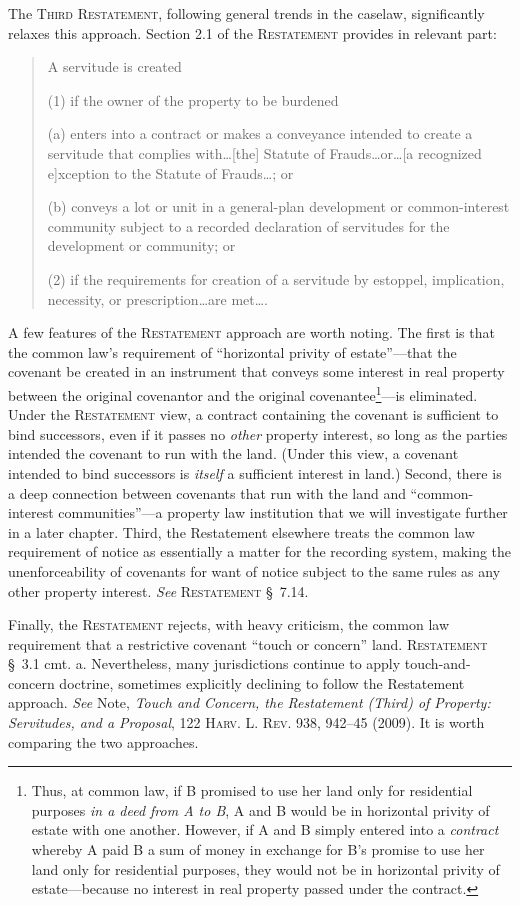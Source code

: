 The \textsc{Third Restatement}, following general trends in the caselaw,
significantly relaxes this approach. Section 2.1 of the \textsc{Restatement}
provides in relevant part:
\begin{quotation}
A servitude is created

(1) if the owner of the property to be burdened
\begin{statute}
\item (a) enters into a contract or makes a conveyance intended to create a
servitude that complies with\ldots [the] Statute of Frauds\ldots or\ldots [a
recognized e]xception to the Statute of Frauds\ldots ; or

\item (b) conveys a lot or unit in a general-plan development or common-interest
community subject to a recorded declaration of servitudes for the development or
community; or
\end{statute}
(2) if the requirements for creation of a servitude by estoppel, implication,
necessity, or prescription\ldots are met\ldots .
\end{quotation}
A few features of the \textsc{Restatement} approach are worth noting. The first
is that
the common law's requirement of ``horizontal privity of estate''---that the
covenant be created in an instrument that conveys some interest in real property
between the original covenantor and the original covenantee\footnote{Thus, at
common law, if B promised to use her land only for residential purposes
\textit{in a deed from A to B}, A and B would be in horizontal privity
of estate with one another. However, if A and B simply entered into a
\textit{contract} whereby A paid B a sum of money in exchange for B's promise to
use her land only for residential purposes, they would not be in horizontal
privity of estate---because no interest in real property passed under the
contract.}---is eliminated. Under the \textsc{Restatement} view, a contract
containing
the covenant is sufficient to bind successors, even if it passes no
\textit{other} property interest, so long as the parties intended the covenant
to run with the land. (Under this view, a covenant intended to bind successors
is \textit{itself} a sufficient interest in land.) Second, there is a deep
connection between covenants that run with the land and ``common-interest
communities''---a property law institution that we will investigate further in a
later chapter. Third, the Restatement elsewhere treats the common law
requirement of notice as essentially a matter for the recording system, making
the unenforceability of covenants for want of notice subject to the same rules
as any other property interest. \emph{See} \textsc{Restatement} \S~7.14.

Finally, the \textsc{Restatement} rejects, with heavy criticism, the common law
requirement that a restrictive covenant ``touch or concern'' land.
\textsc{Restatement} \S~3.1 cmt. a. Nevertheless, many jurisdictions continue
to apply touch-and-concern doctrine, sometimes explicitly declining to follow
the Restatement approach. \textit{See} Note, \emph{Touch and Concern, the
Restatement
(Third) of Property: Servitudes, and a Proposal}, 122 \textsc{Harv. L. Rev.}
938, 942--45 (2009). It is worth comparing the two approaches.


